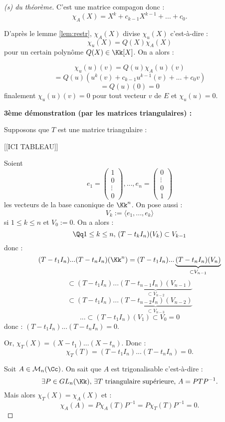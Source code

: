 \documentclass[class=report,crop=false]{standalone}
\newcommand{\GL}{GL}
\begin{document}
\begin{proof}[(s) du théorème]
C'est une matrice compagon donc :
\[\chi_A(X)= X^k + c_{k-1}X^{k-1}+...+c_0 .\]


D'après le lemme \ref{lem:restr}, $\chi_A(X)$ divise $\chi_u(X)$ c'est-à-dire :
\[\chi_u(X)= Q(X)\chi_A(X)\]
pour un certain polynôme $Q(X) \in \Kk[X]$. On a alors :

\[\chi_u(u)(v)= Q(u)\chi_A(u)(v)\]
\[= Q(u)(u^k(v)+c_{k-1}u^{k-1}(v)+...+c_0v)\]
\[=Q(u)(0)=0\]
finalement $\chi_u(u)(v)=0$ pour tout vecteur $v$ de $E$ et $\chi_u(u)=0$.

{\bf 3ème démonstration (par les matrices triangulaires) :}  

Supposons que $T$ est une matrice triangulaire :

[[ICI TABLEAU]]


Soient \[e_1= \left(\begin{array}{c}
1\\0\\
\vdots\\
0
\end{array}\right) ,...,e_n = \left(\begin{array}{c}
0\\
\vdots\\
0\\
1
\end{array}\right)\]
les vecteurs de la base canonique de $\Kk^n$. On pose aussi : 
\[V_k := \langle e_1,...,e_k\rangle \]
si $1\le  k  \le n$ et $V_0 := 0$. On a alors :
\[\Qq 1 \le k \le n , \, (T-t_kI_n)(V_k) \subset V_{k-1} \]
donc :
\[(T-t_1I_n)...(T-t_nI_n)(\Kk^n) = (T-t_1I_n)...\underbrace{(T-t_nI_n)(V_n)}_{\subset V_{n-1}}\]
\[\subset (T-t_1I_n)...\underbrace{(T-t_{n-1}I_n)(V_{n-1})}_{\subset V_{n-2}}\]
\[\subset (T-t_1I_n)...\underbrace{(T-t_{n-2}I_n)(V_{n-2})}_{\subset V_{n-3}}\]
\[... \subset (T-t_1I_n)(V_1) \subset V_0 = 0\]
donc : $(T-t_1I_n)...(T-t_nI_n)=0$.

Or, $\chi_T(X) = (X-t_1)...(X-t_n)$. Donc :
\[\chi_T(T) = (T-t_1I_n)...(T-t_nI_n) =0 .\]

Soit $A \in \mathcal{M}_n(\Cc)$. On sait que $A$ est trigonalisable c'est-à-dire :
\[\exists P \in \GL_n(\Kk),\, \exists T \mbox{ triangulaire supérieure, } A = PTP^{-1} .\]
Mais alors $\chi_T(X) = \chi_A(X)$ et :
\[\chi_A(A) = P \chi_A(T)P^{-1} = P\chi_T(T)P^{-1} = 0 .\]
\end{proof}
\end{document}
